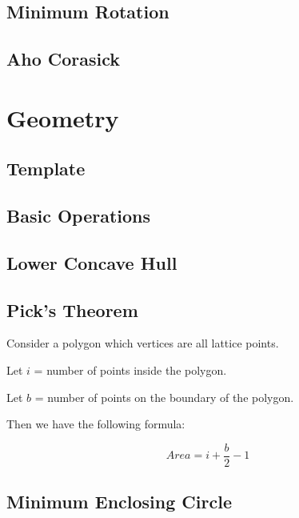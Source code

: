 \documentclass[a4paper,10pt,twocolumn,oneside]{article}
\begin{document}
\subsection{Minimum Rotation}


\subsection{Aho Corasick}







\section{Geometry}

\subsection{Template}


\subsection{Basic Operations}







\subsection{Lower Concave Hull}


\subsection{Pick's Theorem}
Consider a polygon which vertices are all lattice points.

Let $i$ = number of points inside the polygon.

Let $b$ = number of points on the boundary of the polygon.

Then we have the following formula:

$$
Area = i + \frac{b}{2} - 1
$$

\subsection{Minimum Enclosing Circle}

\end{document}
